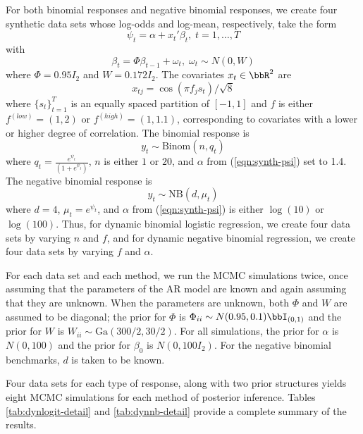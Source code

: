 \documentclass[12pt]{article}
\newcommand{\Ga}{\text{Ga}}
\begin{document}
For both binomial responses and negative binomial responses, we create four
synthetic data sets whose log-odds and log-mean, respectively, take the form
\begin{equation}
\label{eqn:synth-psi}
\psi_t = \alpha + x_t' \beta_t, \; t = 1, \ldots, T
\end{equation}
with
\[
\beta_t = \Phi \beta_{t-1} + \omega_t, \; \omega_t \sim N(0, W)
\]
where $\Phi = 0.95 I_2$ and $W = 0.172 I_2$.  The covariates $x_t \in \bbR^2$
are 
\[
x_{tj} = \cos(\pi f_j s_t) / \sqrt{8}
\]
where $\{s_t\}_{t=1}^T$ is an equally spaced partition of $[-1,1]$ and $f$ is
either $f^{(low)} = (1,2)$ or $f^{(high)} = (1,1.1)$, corresponding to
covariates with a lower or higher degree of correlation.  The binomial response
is
\[
y_t \sim \text{Binom}(n, q_t)
\]
where $q_t = \frac{e^{\psi_t}}{(1+e^{\psi_t})}$, $n$ is either $1$ or $20$, and
$\alpha$ from (\ref{eqn:synth-psi}) set to 1.4.  The negative binomial response
is
\[
y_t \sim \text{NB}(d, \mu_t)
\]
where $d=4$, $\mu_t = e^{\psi_t}$, and $\alpha$ from (\ref{eqn:synth-psi}) is
either $\log(10)$ or $\log(100)$.  Thus, for dynamic binomial logistic
regression, we create four data sets by varying $n$ and $f$, and for dynamic
negative binomial regression, we create four data sets by varying $f$ and
$\alpha$.

For each data set and each method, we run the MCMC simulations twice, once
assuming that the parameters of the AR model are known and again assuming that
they are unknown.  When the parameters are unknown, both $\Phi$ and $W$ are
assumed to be diagonal; the prior for $\Phi$ is $\Phi_{ii} \sim N(0.95, 0.1)
\bbI_{(0,1)}$ and the prior for $W$ is $W_{ii} \sim \Ga(300/2, 30/2)$.  For all
simulations, the prior for $\alpha$ is $N(0, 100)$ and the prior for $\beta_0$
is $N(0, 100 I_2)$.  For the negative binomial benchmarks, $d$ is taken to be
known.

Four data sets for each type of response, along with two prior structures yields
eight MCMC simulations for each method of posterior inference.  Tables
\ref{tab:dynlogit-detail} and \ref{tab:dynnb-detail} provide a complete summary
of the results.

\end{document}
